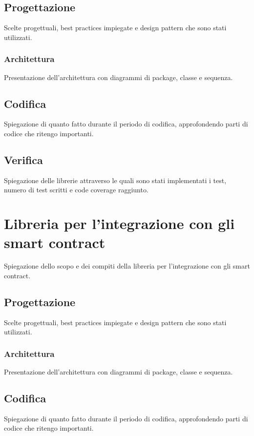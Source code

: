 \subsection{Progettazione}
Scelte progettuali, best practices impiegate e design pattern che sono stati utilizzati. 

\subsubsection{Architettura}
Presentazione dell'architettura con diagrammi di package, classe e sequenza.

\subsection{Codifica}
Spiegazione di quanto fatto durante il periodo di codifica, approfondendo parti di codice che ritengo importanti.

\subsection{Verifica}
Spiegazione delle librerie attraverso le quali sono stati implementati i test, numero di test scritti e code coverage raggiunto.


\section{Libreria per l'integrazione con gli smart contract}
Spiegazione dello scopo e dei compiti della libreria per l'integrazione con gli smart contract.

\subsection{Progettazione}
Scelte progettuali, best practices impiegate e design pattern che sono stati utilizzati. 

\subsubsection{Architettura}
Presentazione dell'architettura con diagrammi di package, classe e sequenza.

\subsection{Codifica}
Spiegazione di quanto fatto durante il periodo di codifica, approfondendo parti di codice che ritengo importanti.

